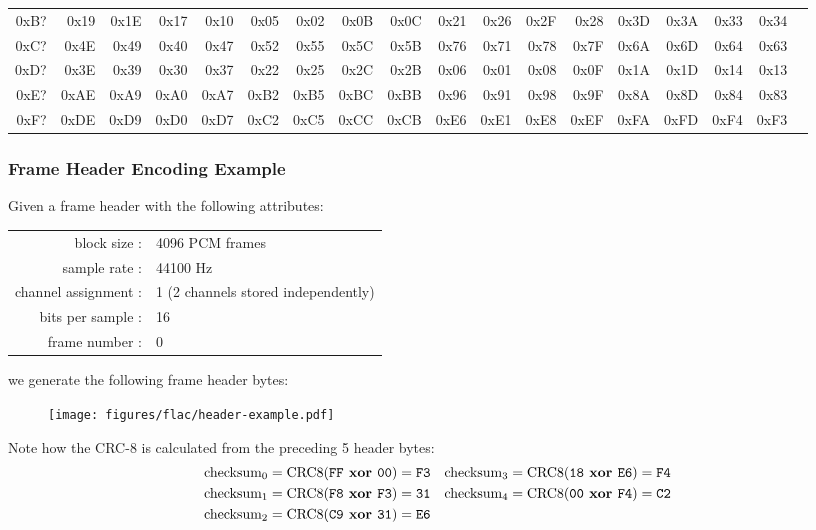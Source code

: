 \begin{table}[h]
{\begin{tabular}{|r||r|r|r|r|r|r|r|r|r|r|r|r|r|r|r|r|r|}
0xB? & 0x19 & 0x1E & 0x17 & 0x10 & 0x05 & 0x02 & 0x0B & 0x0C & 0x21 & 0x26 & 0x2F & 0x28 & 0x3D & 0x3A & 0x33 & 0x34 \\
0xC? & 0x4E & 0x49 & 0x40 & 0x47 & 0x52 & 0x55 & 0x5C & 0x5B & 0x76 & 0x71 & 0x78 & 0x7F & 0x6A & 0x6D & 0x64 & 0x63 \\
0xD? & 0x3E & 0x39 & 0x30 & 0x37 & 0x22 & 0x25 & 0x2C & 0x2B & 0x06 & 0x01 & 0x08 & 0x0F & 0x1A & 0x1D & 0x14 & 0x13 \\
0xE? & 0xAE & 0xA9 & 0xA0 & 0xA7 & 0xB2 & 0xB5 & 0xBC & 0xBB & 0x96 & 0x91 & 0x98 & 0x9F & 0x8A & 0x8D & 0x84 & 0x83 \\
0xF? & 0xDE & 0xD9 & 0xD0 & 0xD7 & 0xC2 & 0xC5 & 0xCC & 0xCB & 0xE6 & 0xE1 & 0xE8 & 0xEF & 0xFA & 0xFD & 0xF4 & 0xF3 \\
\hline
\end{tabular}
}
\end{table}

\subsubsection{Frame Header Encoding Example}
Given a frame header with the following attributes:
\begin{table}[h]
\begin{tabular}{rl}
block size : & 4096 PCM frames \\
sample rate : & 44100 Hz \\
channel assignment : & 1 (2 channels stored independently) \\
bits per sample : & 16 \\
frame number : & 0
\end{tabular}
\end{table}
\par
\noindent
we generate the following frame header bytes:
\begin{figure}[h]
\texttt{[image: figures/flac/header-example.pdf]}
\end{figure}
\par
\noindent
Note how the CRC-8 is calculated from the preceding 5 header bytes:
\begin{align*}
\text{checksum}_0 = \text{CRC8}(\texttt{FF}\textbf{ xor }\texttt{00}) = \texttt{F3} & &
\text{checksum}_3 = \text{CRC8}(\texttt{18}\textbf{ xor }\texttt{E6}) = \texttt{F4} \\
\text{checksum}_1 = \text{CRC8}(\texttt{F8}\textbf{ xor }\texttt{F3}) = \texttt{31} & &
\text{checksum}_4 = \text{CRC8}(\texttt{00}\textbf{ xor }\texttt{F4}) = \texttt{C2} \\
\text{checksum}_2 = \text{CRC8}(\texttt{C9}\textbf{ xor }\texttt{31}) = \texttt{E6} \\
\end{align*}

